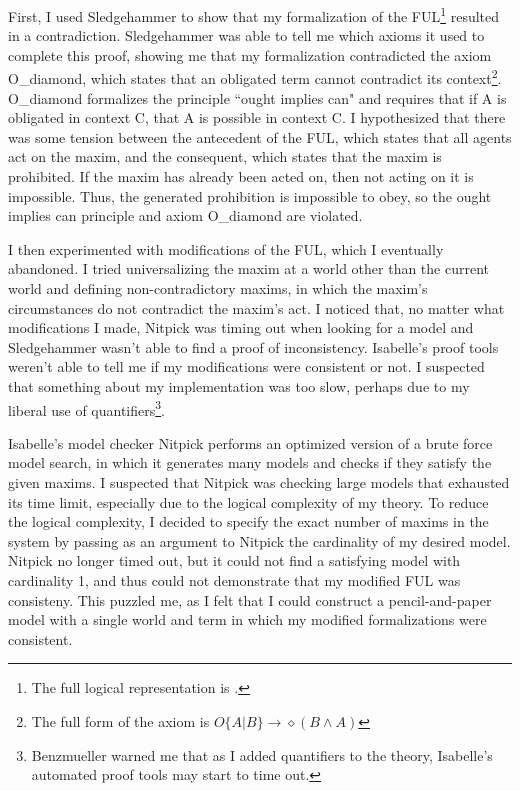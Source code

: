 \begin{isabellebody}
\begin{isamarkuptext}
First, I used Sledgehammer to show that my formalization of the FUL\footnote{The full logical representation is .}
resulted in a contradiction. Sledgehammer was able to tell me which axioms it used to complete 
this proof, showing me that my formalization contradicted the axiom O\_diamond, which states that an 
obligated term cannot contradict its context\footnote{The full form of the axiom is 
$ O \{ A \vert B \} \longrightarrow \diamond (B \wedge A)$}. 
O\_diamond formalizes the principle ``ought implies can" and requires that if A is obligated in context 
C, that A is possible in context C. I hypothesized that there was some tension between 
the antecedent of the FUL, which states that all agents act on the maxim, and the consequent, 
which states that the maxim is prohibited. If the maxim has already been acted on, then not acting on it
is impossible. Thus, the generated prohibition is impossible to obey, so the ought implies can principle
and axiom O\_diamond are violated.

I then experimented with modifications of the FUL, which I eventually abandoned. I tried universalizing the maxim 
at a world other than the current world and defining non-contradictory maxims, in which the maxim's 
circumstances do not contradict the maxim's act. I noticed that, no matter what modifications I made, 
Nitpick was timing out when looking for a model and Sledgehammer wasn't able to find a proof of
inconsistency. Isabelle's proof tools weren't able to tell me if my modifications were 
consistent or not. I suspected that something about my implementation was too slow, perhaps due to 
my liberal use of quantifiers\footnote{Benzmueller warned me that as 
I added quantifiers to the theory, Isabelle's automated proof tools may start to time out.}. 

Isabelle's model checker Nitpick performs an optimized version of a brute force model search, in which it generates many models
and checks if they satisfy the given maxims. I suspected that Nitpick 
was checking large models that exhausted its 
time limit, especially due to the logical complexity of my theory. 
To reduce the logical complexity, I decided to specify the exact number of maxims 
in the system by passing as an argument to Nitpick the cardinality of my desired model. Nitpick no longer
timed out, but it could not find a satisfying model with cardinality 1, and thus could not demonstrate
that my modified FUL was consisteny.
 This puzzled me, as I felt that I could construct a pencil-and-paper 
model with a single world and term in which my modified formalizations were consistent.


\end{isamarkuptext}
\end{isabellebody}

